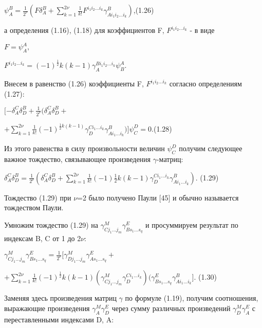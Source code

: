 \documentclass{article}
\begin{document}
{\begin{center}
$\psi_{A}^{B}=\frac{1}{2^{\nu}}(F\delta_{A}^{B}+\sum_{k=1}^{2\nu}\frac{1}{k!}F^{i_1 i_2 \dots i_k}\gamma^{B}_{Ai_1 i_2 \dots i_k})$,(1.26) \par
\end{center}
а определения (1.16), (1.18) для коэффициентов F, $F^{i_1 i_2 \dots i_k}$ - в виде\par
\begin{center}
$F=\psi_{A}^{A},$\par
$F^{i_1 i_2 \dots i_k} = (-1)^\frac{1}{2}k(k-1)\gamma_{A}^{Bi_1 i_2 \dots i_k}\psi_{B}^{A}.$\par
\end{center}
Внесем в равенство (1.26) коэффициенты F, $F^{i_1 i_2 \dots i_k}$ согласно определениям (1.27):\par
$[-\delta_{A}^{C}\delta_{D}^{B}+\frac{1}{2^{\nu}}(\delta_{A}^{C}\delta_{D}^{B}+$ \par
\begin{center}
$+\sum_{k=1}^{2\nu}\frac{1}{k!}(-1)^{\frac{1}{2}k(k-1)}\gamma^{C i_1 \dots i_k}_{D}\gamma^{B}_{A i_1 \dots i_k})]\psi^{D}_{C}=0.$(1.28)\par
\end{center}
Из этого равенства в силу произвольности величин $\psi^{D}_{C}$ получим следующее важное тождество, связывающее произведения $\gamma$-матриц:\par
$\delta_{A}^{C}\delta_{D}^{B}=\frac{1}{2^{\nu}}(\delta_{A}^{C}\delta_{D}^{B}+\sum_{k=1}^{2\nu}\frac{1}{k!}(-1)\frac{1}{2}k(k-1)\gamma^{C i_1 \dots i_k}_{D}\gamma^{B}_{A i_1 \dots i_k})$. (1.29)\par
Тождество (1.29) при $\nu$=2 было получено Паули [45] и обычно называется тождеством Паули.\par
Умножим тождество (1.29) на $\gamma^{M}_{Cj_1 \dots j_m}\gamma^{E}_{Bs_1 \dots s_q}$ и просуммируем результат по индексам B, C от 1 до 2$\nu$:\par
$\gamma^{M}_{Cj_1 \dots j_m}\gamma^{E}_{Bs_1 \dots s_q}=\frac{1}{2^{\nu}}[\gamma^{M}_{Dj_1 \dots j_m}\gamma^{E}_{As_1 \dots s_q}+$\par
$+\sum_{k=1}^{2\nu}\frac{1}{k!}(-1)^\frac{1}{2}k(k-1)(\gamma^{M}_{Cj_1 \dots j_m}\gamma^{Ci_1 \dots i_k}_{D})(\gamma^{E}_{Bs_1 \dots s_q}\gamma^{B}_{Ai_1 \dots i_k}]$. (1.30) \par
Заменяя здесь произведения матриц $\gamma$ по формуле (1.19), получим соотношения, выражающие произведения $\gamma^{M}_{A}\gamma^{E}_{D}$ через сумму различных произведений $\gamma^{M}_{D}\gamma^{E}_{A}$ с переставленными индексами D, A:\par
}
\end{document}
